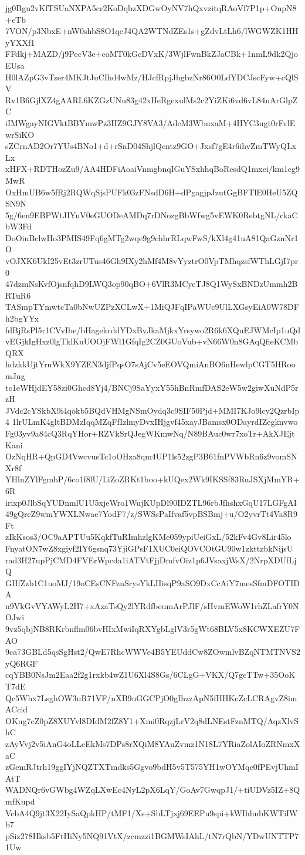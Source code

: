 jg0Bgu2vKfTSUaNXPA5cr2KoDqbzXDGwOyNV7hQxvzitqRAoVf7P1p+OnpN8+cTb
7VON/p3NbxE+nW0shbS8O1qeJ4QA2WTNdZEs1s+gZdvLtLh6/lWGWZK1HHyYXXf1
FFdkj+MAZD/j9PecV3e+coMT0kGcDVxK/3WjlFwnBkZJaCBk+1nmL9dk2QjoEUsa
H0lAZpG3vTzer4MKJtJuCIhd4wMz/HJcfRpjJbgbzNr86O0LdYDCJscFyw+cQlSV
Rv1B6GjlXZ4gAARL6KZGzUNu83g42xHeRgexulMs2c2YiZKi6vd6vL84nArGlpZC
iIMWgayNIGVktBBYmwPz3HZ9GJY8VA3/AdeM3WbnxaM+4HYC3ugt0rFvlEwrSiKO
sZCrnAD2Or7YUs4BNo1+d+rSnD04ShjlQcntz9GO+Jxsf7gE4r6ihvZmTWyQLxLx
xHFX+RDTHozZu9/AA4HDFiAoaiVnmgbnqIGuYSxhhqBoResdQ1mxei/km1cg9MwR
OxHmUB6w5fRj2RQWqSjsPUFk03zFNsdD6H+dPgagjpJzutGgBFTlE0HeU5ZQSN9N
5g/6en9EBPWtJIYuV0eGUODeAMDq7rDNozgBbWfwg5vEWK0RebtgNL/ckaCbW3Fd
DoOiuBclwHo3PMIS49Fq6gMTg2wqe9g9chhrRLqwFwS/kXl4g41uA81QaGznNr1O
vOJXK6UkI25vEt3zrUTus46Gh9IXy2hMf4M8vYyztrO0VpTMhqzsfWThLGjI7pr0
47dzmNsKvfOjsnfqhD9LWQ3op90qBO+6VlR3MCyeTJ8Q1WySxBNDzUmmh2BRTuR6
TASmpTYmwtcTa0bNwUZPzXCLwX+1MiQJFqIPaWUc9UlLXGsyEiA0W78DFh2bgYYx
fdBjRsPl5r1CVvIbe/bHagekrddYDxBvJkaMjkxYrsywo2R6k6XQuEJWMcIp1uQd
vEGjkIgHxz0lgTklKuUOOjFWl1GfqIg2CZ0GUoVub+vN66W0n8GAqQfieKCMbQRX
hdzkkUjtYruWkX9YZEN3djfPqsO7sAjCv5eEOVQmiAnBO6nHewlpCGT5HRoomJug
tc1eWHjdEY58zi0Ghcd8Yj4/BNCj9SaYyxY55hBnRmfDAS2eW5w2giwXuNdP5rzH
JVdc2cYSkbX9i4qokb5BQdVHMgNSmOydq3c9SIF50Pjd+MMI7KJo9lcy2QzrbIp4
1lrULmK4gltBDMzIqqMZqFfIzlmyDvxIHjgvf45xayJBamsx0ODayrdIZegknvwo
Fg03yv9a84cQ3RqYHor+RZVkSrQJegWKmwNq/N89BAuc0wr7xoTr+AkXJEjtKani
OzNqHR+QpGD4VwcvusTc1oOHza8qm4UP1ls52zgP3B61fnPVWbRn6z9vomSNXr8f
YHlnZYlFgmbP/6co1f8lU/LiZoZRKt1boo+kUQex2Wk9IKSSf83RuJSXjMmYR+6R
irixp0JlbSqYUDnmlU1U5xjeWro1WujKUpDl90IDZTL96rbJfhshxGqU17LGFgAI
49gQreZ9wmYWXLNwae7YodF7/z/SWSsPaIfvaf5vpBSBmj+u/O2yvrTt4Va8R9Ft
zIkKsos3/OC9aAPTUu5KqkfTuRImhzlgKMe059ypiUeiGxL/52kFv4Gv8Lir45lo
FnyatON7wZ8xgiyf2IY6gsnq73YjiGPsF1XUC0eiQOVCOtGU90w1zkttzbkNijsU
rad3H27upPjCMD4FVErWpcda1iATVtFjjDmfvOiz1p6JVsaxjWsX/2NrpXDUfLjQ
GHfZzb1C1uoMJ/19oCEsCNFznSrysYkLIIisqP9aSO9DxCcAiY7mesSfmDFOTIDA
n9VkGvVYAWyL2H7+xAzaTsQy2lYRdfbeumArPJlF/sHvmEWoW1rhZLafrY0NOJwi
9vz5qbjNB8RKrbnflm06bvHIxMwiIqRXYgbLglV3r5gWt68BLV5x8KCWXEZU7FAO
9ca73GBLd5qsSgHst2/QwE7RhcWWVe4B5YEUddCw8ZOwmlvBZqNTMTNVS2yQ6RGF
cqYBB0NsJm2Eaa2f2g1rxkb4wZ1U6Xl4S8Gs/6CLgG+VKX/Q7gcTTw+35OoKT7dE
Qc5Whx7LsghOW3uR71VF/nXB9uGGCPjO0gIhzzApN5fHHKcZcLCRAgvZ8imACcid
OKug7cZ0pZ8XUYvl8DIdM2fZ8Y1+Xmi0RqzjLrV2q8dLNEstFznMTQ/AqzXlvShC
zAyVvj2v5iAnG4oLLeEkMs7DPs8rXQiM8YAuZvmz1N18L7YRiaZolAIoZRNmxXaC
zGemRJtrh19ggIYjNQZTXTmdks5Ggvo9bdH5v5T575YH1wOYMqc0fPEvjUhmIAtT
WADNQr6vGWbg4WZqLXwEc4NyL2pX6LqY/GoAv7GwqpJ1/+tiUDVz5IZ+8QmfKupd
VcbA4Q9jt3X22IySaQpkHP/tMF1/Xs+SbLTjxj69EEPu9spi+kWIhhnbKWTiIWb7
pSiz278Hksb5FtHiNy5NQ91VtX/zcmzzi1BGMWsIAhL/tN7rQbN/YDwUNTTP71Uw
